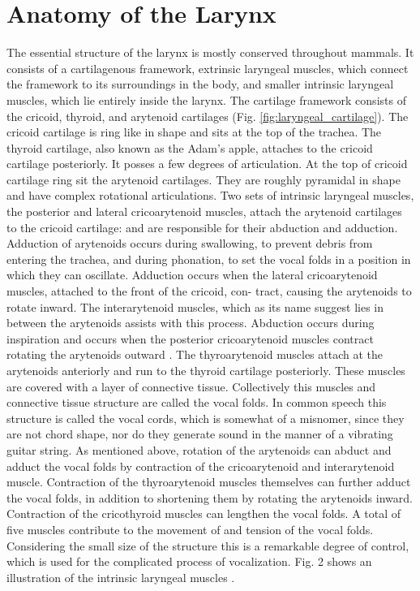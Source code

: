 \documentclass[12pt, letter]{report}
\begin{document}
\section{Anatomy of the Larynx}
The essential structure of the larynx is mostly conserved throughout mammals. It consists of a cartilagenous framework, extrinsic laryngeal muscles, which connect the framework to its surroundings in the body, and smaller intrinsic laryngeal muscles, which lie entirely inside the larynx. The cartilage framework consists of the cricoid, thyroid, and arytenoid cartilages (Fig. \ref{fig:laryngeal_cartilage}). The cricoid cartilage is ring like in shape and sits at the top of the trachea. The thyroid cartilage, also known as the Adam’s apple, attaches to the cricoid cartilage posteriorly. It posses a few degrees of articulation. At the top of cricoid cartilage ring sit the arytenoid cartilages. They are roughly pyramidal in shape and have complex rotational articulations. Two sets of intrinsic laryngeal muscles, the posterior and lateral cricoarytenoid muscles, attach the arytenoid cartilages to the cricoid cartilage: and are responsible for their abduction and adduction. Adduction of arytenoids occurs during swallowing, to prevent debris from entering the trachea, and during phonation, to set the vocal folds in a position in which they can oscillate. Adduction occurs when the lateral cricoarytenoid muscles, attached to the front of the cricoid, con- tract, causing the arytenoids to rotate inward. The interarytenoid muscles, which as its name suggest lies in between the arytenoids assists with this process. Abduction occurs during inspiration and occurs when the posterior cricoarytenoid muscles contract rotating the arytenoids outward \cite{Berke2010}. The thyroarytenoid muscles attach at the arytenoids anteriorly and run to the thyroid cartilage posteriorly. These muscles are covered with a layer of connective tissue. Collectively this muscles and connective tissue structure are called the vocal folds. In common speech this structure is called the vocal cords, which is somewhat of a misnomer, since they are not chord shape, nor do they generate sound in the manner of a vibrating guitar string. As mentioned above, rotation of the arytenoids can abduct and adduct the vocal folds by contraction of the cricoarytenoid and interarytenoid muscle. Contraction of the thyroarytenoid muscles themselves can further adduct the vocal folds, in addition to shortening them by rotating the arytenoids inward. Contraction of the cricothyroid muscles can lengthen the vocal folds. A total of five muscles contribute to the movement of and tension of the vocal folds. Considering the small size of the structure this is a remarkable degree of control, which is used for the complicated process of vocalization. Fig. 2 shows an illustration of the intrinsic laryngeal muscles \cite{Berke2010}. 
\end{document}
